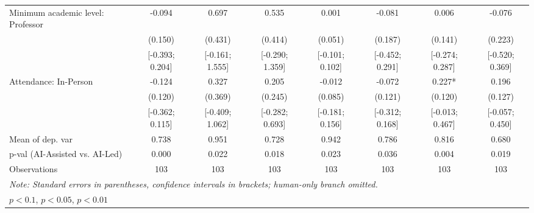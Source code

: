 \begin{tabular}{l*{7}{c}}
Minimum academic level: Professor&      -0.094   &       0.697   &       0.535   &       0.001   &      -0.081   &       0.006   &      -0.076   \\
                    &     (0.150)   &     (0.431)   &     (0.414)   &     (0.051)   &     (0.187)   &     (0.141)   &     (0.223)   \\
                    &[-0.393; 0.204]   &[-0.161; 1.555]   &[-0.290; 1.359]   &[-0.101; 0.102]   &[-0.452; 0.291]   &[-0.274; 0.287]   &[-0.520; 0.369]   \\
Attendance: In-Person&      -0.124   &       0.327   &       0.205   &      -0.012   &      -0.072   &       0.227*  &       0.196   \\
                    &     (0.120)   &     (0.369)   &     (0.245)   &     (0.085)   &     (0.121)   &     (0.120)   &     (0.127)   \\
                    &[-0.362; 0.115]   &[-0.409; 1.062]   &[-0.282; 0.693]   &[-0.181; 0.156]   &[-0.312; 0.168]   &[-0.013; 0.467]   &[-0.057; 0.450]   \\
\hline
Mean of dep. var    &       0.738   &       0.951   &       0.728   &       0.942   &       0.786   &       0.816   &       0.680   \\
p-val (AI-Assisted vs. AI-Led)&       0.000   &       0.022   &       0.018   &       0.023   &       0.036   &       0.004   &       0.019   \\
Observations        &         103   &         103   &         103   &         103   &         103   &         103   &         103   \\
\hline\hline
\multicolumn{8}{l}{\it{Note:} Standard errors in parentheses, confidence intervals in brackets; human-only branch omitted.}\\
\multicolumn{8}{l}{\sym{*} \(p<0.1\), \sym{**} \(p<0.05\), \sym{***} \(p<0.01\)}\\
\end{tabular}
